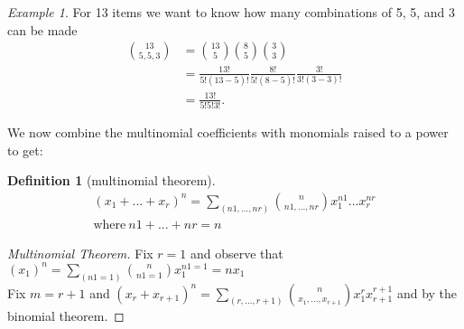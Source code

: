 \documentclass{article}
\theoremstyle{plain}
\theoremstyle{definition}
\newtheorem{definition}{Definition}
\theoremstyle{remark}
\newtheorem{example}{Example}
\begin{document}
\begin{example}
  For 13 items we want to know how many combinations of 5, 5, and 3 can be made
  \begin{align*}
    \binom{13}{5,5,3} &= \binom{13}{5}\binom{8}{5}\binom{3}{3} \\
                      &= \frac{13!}{5!(13-5)!}\frac{8!}{5!(8-5)!}\frac{3!}{3!(3-3)!} \\
                      &=\frac{13!}{5!5!3!}.
  \end{align*}
\end{example}
We now combine the multinomial coefficients with monomials raised to a power to get:
\begin{definition}[multinomial theorem]
  \begin{align*}
    (x_1+...+x_r)^n = \sum_{(n1,...,nr)}\binom{n}{n1,...,nr}x_1^{n1}...x_r^{nr} \\
    \text{where}\ n1 + ... + nr = n
  \end{align*}
\end{definition}
\begin{proof}[Multinomial Theorem]
  Fix $r = 1$ and observe that $(x_1)^n=\sum_{(n1 = 1)}\binom{n}{n1 = 1}x_1^{n1 = 1} = nx_1$ \\
  Fix $m = r + 1$ and $(x_r + x_{r+1})^n = \sum_{(r, ..., r+1)}\binom{n}{x_1,...,x_{r+1}}x_1^rx_{r+1}^{r+1}$  and by the binomial theorem.
\end{proof}
\end{document}

